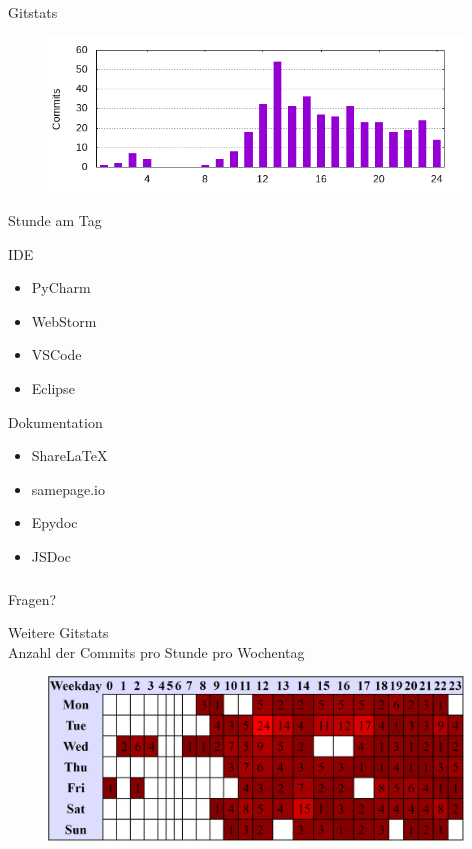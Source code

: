 \documentclass[11pt, usepdftitle=false,...]{beamer}
\begin{document}
	\begin{frame}{Gitstats}
	    \begin{figure}[ht] 
					\centering
					\includegraphics[width=11cm]{images/hour_of_day.png}
				\end{figure}
				\small\centering Stunde am Tag
	\end{frame}
	
	
	
	\begin{frame}{IDE}
	    \begin{itemize}
	        \item PyCharm
	        \item WebStorm
	        \item VSCode
	        \item Eclipse
	    \end{itemize}
	\end{frame}
	
	\begin{frame}{Dokumentation}
	    \begin{itemize}[<+->]
	        \item ShareLaTeX
	        \item samepage.io
	        \item Epydoc
	        \item JSDoc
	    \end{itemize}
	\end{frame}
	    
	
	\begin{frame}
		\frametitle{}
		\centering
		\Huge Fragen?
	\end{frame}
	
	
	\begin{frame}{Weitere Gitstats \\\small Anzahl der Commits pro Stunde pro Wochentag}
	    \begin{figure}[ht] 
					\centering
					\includegraphics[width=11cm]{images/hours_of_week.PNG}
				\end{figure}
	\end{frame}
	
\end{document}
